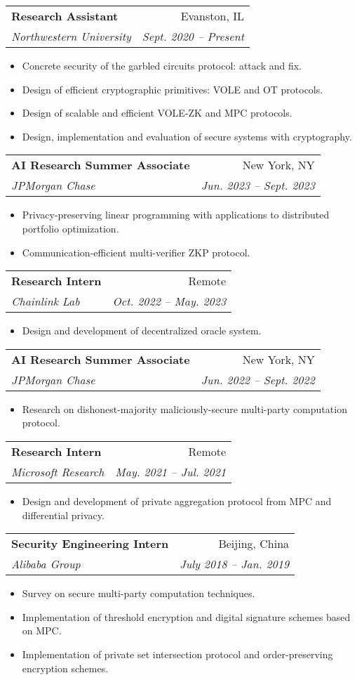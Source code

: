 \documentclass[letterpaper,11pt]{article}
\makeatletter
\newcommand{\resumeItem}[1]{
  \item\small{
    {#1 \vspace{-2pt}}
  }
}
\newcommand{\resumeSubheading}[4]{
  \vspace{-2pt}\item
    \begin{tabular*}{0.97\textwidth}[t]{l@{\extracolsep{\fill}}r}
      \textbf{#1} & #2 \\
      \textit{\small#3} & \textit{\small #4} \\
    \end{tabular*}\vspace{-7pt}
}
\newcommand{\resumeSubSubheading}[2]{
    \item
    \begin{tabular*}{0.97\textwidth}{l@{\extracolsep{\fill}}r}
      \textit{\small#1} & \textit{\small #2} \\
    \end{tabular*}\vspace{-7pt}
}
\newcommand{\resumeSubHeadingListEnd}{\end{itemize}}
\newcommand{\resumeItemListStart}{\begin{itemize}}
\newcommand{\resumeItemListEnd}{\end{itemize}\vspace{-5pt}}
\makeatother
\begin{document}
    \resumeSubheading
      {Research Assistant}{Evanston, IL}
      {Northwestern University}{Sept. 2020 -- Present}
      \resumeItemListStart
        \resumeItem{Concrete security of the garbled circuits protocol: attack and fix.}
        \resumeItem{Design of efficient cryptographic primitives: VOLE and OT protocols.}
        \resumeItem{Design of scalable and efficient VOLE-ZK and MPC protocols.}
        \resumeItem{Design, implementation and evaluation of secure systems with cryptography.}
      \resumeItemListEnd

    \resumeSubheading
      {AI Research Summer Associate}{New York, NY}
      {JPMorgan Chase}{Jun. 2023 -- Sept. 2023}
      \resumeItemListStart
        \resumeItem{Privacy-preserving linear programming with applications to distributed portfolio optimization.}
        \resumeItem{Communication-efficient multi-verifier ZKP protocol.}
      \resumeItemListEnd

    \resumeSubheading
      {Research Intern}{Remote}
      {Chainlink Lab}{Oct. 2022 -- May. 2023}
      \resumeItemListStart
        \resumeItem{Design and development of decentralized oracle system.}
      \resumeItemListEnd

    \resumeSubheading
      {AI Research Summer Associate}{New York, NY}
      {JPMorgan Chase}{Jun. 2022 -- Sept. 2022}
      \resumeItemListStart
        \resumeItem{Research on dishonest-majority maliciously-secure multi-party computation protocol.}
      \resumeItemListEnd

    \resumeSubheading
      {Research Intern}{Remote}
      {Microsoft Research}{May. 2021 -- Jul. 2021}
      \resumeItemListStart
        \resumeItem{Design and development of private aggregation protocol from MPC and differential privacy.}
      \resumeItemListEnd
      
    \resumeSubheading
      {Security Engineering Intern}{Beijing, China}
      {Alibaba Group}{July 2018 -- Jan. 2019}
      \resumeItemListStart
        \resumeItem{Survey on secure multi-party computation techniques.}
        \resumeItem{Implementation of threshold encryption and digital signature schemes based on MPC.}
        \resumeItem{Implementation of private set intersection protocol and order-preserving encryption schemes.}
      \resumeItemListEnd
\end{document}
